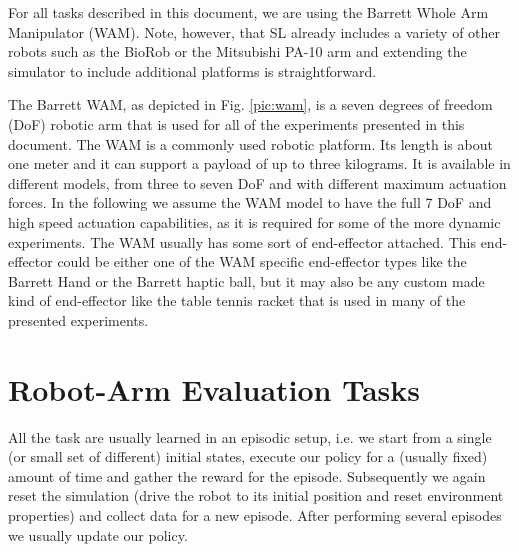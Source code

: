 \documentclass[11pt, article, colorback]{article}
\begin{document}
For all tasks described in this document, we are using the Barrett Whole Arm Manipulator 
(WAM). Note, however, that SL already includes a variety of other robots such as the BioRob or the
Mitsubishi PA-10 arm and extending the simulator to include additional platforms is straightforward.

The Barrett WAM, as depicted in Fig. \ref{pic:wam}, is a seven degrees of freedom (DoF) robotic arm that is used for all of the experiments 
presented in this document. The WAM is a commonly used robotic platform. Its length is about one meter and it can support
a payload of up to three kilograms. It is available in different models, from three to seven DoF and with different maximum actuation 
forces. In the following we assume the WAM model to have the full 7 DoF and high speed actuation capabilities, as it is 
required for some of the more dynamic experiments. The WAM usually has some sort of end-effector attached. This end-effector could be either 
one of the WAM specific end-effector types like the Barrett Hand or the Barrett haptic ball, but it may also be any custom made kind 
of end-effector like the table tennis racket that is used in many of the presented experiments. 




\newpage
\section{Robot-Arm Evaluation Tasks}
%
All the task are usually learned in an episodic setup, i.e. we start from a single (or small set of different) initial states, execute our policy for a (usually fixed) amount
of time and gather the reward for the episode. Subsequently we again reset the simulation (drive the robot to its initial position and reset environment properties) and collect data for a new episode.
 After performing several episodes we usually update our policy. 
\end{document}
